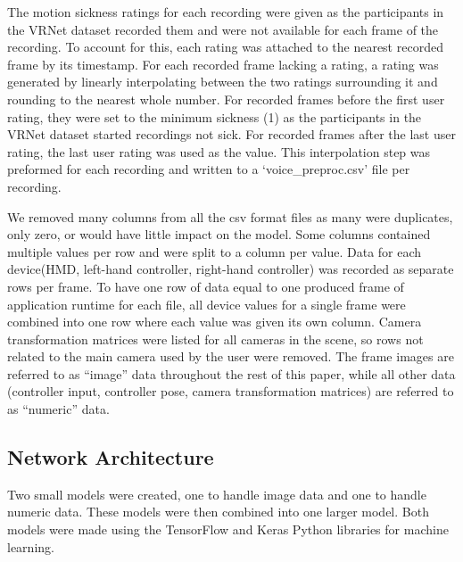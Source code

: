 The motion sickness ratings for each recording were given as the participants in the VRNet dataset recorded them and were not available for each frame of the recording.
To account for this, each rating was attached to the nearest recorded frame by its timestamp.
For each recorded frame lacking a rating, a rating was generated by linearly interpolating between the two ratings surrounding it and rounding to the nearest whole number.
For recorded frames before the first user rating, they were set to the minimum sickness (1) as the participants in the VRNet dataset started recordings not sick.
For recorded frames after the last user rating, the last user rating was used as the value.
This interpolation step was preformed for each recording and written to a `voice\_preproc.csv' file per recording.

We removed many columns from all the csv format files as many were duplicates, only zero, or would have little impact on the model.
Some columns contained multiple values per row and were split to a column per value.
Data for each device(HMD, left-hand controller, right-hand controller) was recorded as separate rows per frame.
To have one row of data equal to one produced frame of application runtime for each file, all device values for a single frame were combined into one row where each value was given its own column.
Camera transformation matrices were listed for all cameras in the scene, so rows not related to the main camera used by the user were removed.
The frame images are referred to as ``image'' data throughout the rest of this paper, while all other data (controller input, controller pose, camera transformation matrices) are referred to as ``numeric'' data.

\subsection{Network Architecture}
\label{subsec:architecture}

Two small models were created, one to handle image data and one to handle numeric data.
These models were then combined into one larger model.
Both models were made using the TensorFlow and Keras Python libraries for machine learning.

